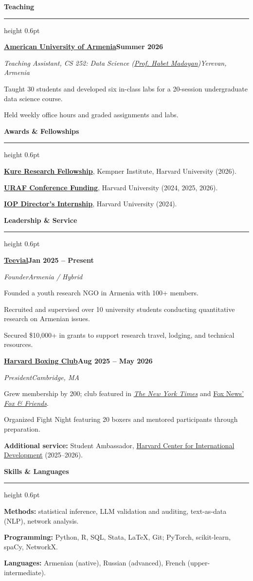 \documentclass[11pt]{article}
\newcommand{\cvsection}[2][6\baselineskip]{%
  \Needspace{#1}%
  \vspace{5pt}%
  {\large\bfseries #2}\par
  \vspace{1pt}\hrule height 0.6pt \vspace{3pt}}
\newcommand{\cventry}[5][5\baselineskip]{%
  \Needspace{#1}%
  \vspace{2pt}%
  {\textbf{#2}\hfill\textbf{#3}\par}%
  {\textit{#4}\hfill\textit{#5}\par}%
}
\newcommand{\lnKempner}{https://kempnerinstitute.harvard.edu/}
\newcommand{\lnCID}{https://www.hks.harvard.edu/centers/cid}
\newcommand{\lnAUA}{https://aua.am/}
\newcommand{\lnMadoyan}{https://profiles.aua.am/user/hmadoyan/}
\newcommand{\lnTeevial}{https://teevial.org}
\newcommand{\lnNYT}{https://www.nytimes.com/2026/05/09/us/college-boxing-harvard.html}
\newcommand{\lnFox}{https://x.com/foxandfriends/status/2060728811256164437}
\newcommand{\lnIOP}{https://iop.harvard.edu/internships-and-careers/directors-internship}
\newcommand{\lnURAF}{https://uraf.harvard.edu/conference-funding}
\newcommand{\lnBoxing}{https://soco.college.harvard.edu/257781/leadership-team/}
\begin{document}
\cvsection{Teaching}
\cventry{\href{\lnAUA}{American University of Armenia}}{Summer 2026}
        {Teaching Assistant, CS 252: Data Science (\href{\lnMadoyan}{Prof. Habet Madoyan})}{Yerevan, Armenia}
\begin{tight}
  \item Taught 30 students and developed six in-class labs for a 20-session undergraduate data science course.
  \item Held weekly office hours and graded assignments and labs.
\end{tight}

\cvsection{Awards \& Fellowships}
\begin{tight}
  \item \textbf{\href{\lnKempner}{Kure Research Fellowship}}, Kempner Institute, Harvard University (2026).
  \item \textbf{\href{\lnURAF}{URAF Conference Funding}}, Harvard University (2024, 2025, 2026).
  \item \textbf{\href{\lnIOP}{IOP Director's Internship}}, Harvard University (2024).
\end{tight}

\cvsection{Leadership \& Service}
\cventry{\href{\lnTeevial}{Teevial}}{Jan 2025 -- Present}{Founder}{Armenia / Hybrid}
\begin{tight}
  \item Founded a youth research NGO in Armenia with 100+ members.
  \item Recruited and supervised over 10 university students conducting quantitative research on Armenian issues.
  \item Secured \$10{,}000+ in grants to support research travel, lodging, and technical resources.
\end{tight}
\cventry{\href{\lnBoxing}{Harvard Boxing Club}}{Aug 2025 -- May 2026}{President}{Cambridge, MA}
\begin{tight}
  \item Grew membership by 200; club featured in \href{\lnNYT}{\textit{The New York Times}} and \href{\lnFox}{Fox News' \textit{Fox \& Friends}}.
  \item Organized Fight Night featuring 20 boxers and mentored participants through preparation.
\end{tight}
{\textbf{Additional service:} Student Ambassador, \href{\lnCID}{Harvard Center for International Development} (2025--2026).\par}

\cvsection{Skills \& Languages}
{\textbf{Methods:} statistical inference, LLM validation and auditing, text-as-data (NLP), network analysis.\par}
{\textbf{Programming:} Python, R, SQL, Stata, LaTeX, Git; PyTorch, scikit-learn, spaCy, NetworkX.\par}
{\textbf{Languages:} Armenian (native), Russian (advanced), French (upper-intermediate).\par}
\end{document}
